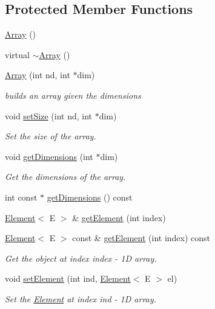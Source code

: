 \subsection*{Protected Member Functions}
\begin{DoxyCompactItemize}
\item 
\hyperlink{classbridges_1_1datastructure_1_1_array_a23cb659c4f39e5e6f3b29a58e97b8e0d}{Array} ()
\item 
virtual \hyperlink{classbridges_1_1datastructure_1_1_array_a5a9f212f560e9673259eece27d8f11cc}{$\sim$\+Array} ()
\item 
\hyperlink{classbridges_1_1datastructure_1_1_array_ac107ce41bbb435dfe6b92129c47bf58e}{Array} (int nd, int $\ast$dim)
\begin{DoxyCompactList}\small\item\em builds an array given the dimensions \end{DoxyCompactList}\item 
void \hyperlink{classbridges_1_1datastructure_1_1_array_a2bfb10e98b1745a7ca173459626352a9}{set\+Size} (int nd, int $\ast$dim)
\begin{DoxyCompactList}\small\item\em Set the size of the array. \end{DoxyCompactList}\item 
void \hyperlink{classbridges_1_1datastructure_1_1_array_aa2a14939c8e53087e833ebf71822a057}{get\+Dimensions} (int $\ast$dim)
\begin{DoxyCompactList}\small\item\em Get the dimensions of the array. \end{DoxyCompactList}\item 
int const  $\ast$ \hyperlink{classbridges_1_1datastructure_1_1_array_a6d9edc546fa172a47f19de3c2ea93ebf}{get\+Dimensions} () const
\item 
\hyperlink{classbridges_1_1datastructure_1_1_element}{Element}$<$ E $>$ \& \hyperlink{classbridges_1_1datastructure_1_1_array_aaf44dbc671651d6e1383d1c523348f28}{get\+Element} (int index)
\item 
\hyperlink{classbridges_1_1datastructure_1_1_element}{Element}$<$ E $>$ const  \& \hyperlink{classbridges_1_1datastructure_1_1_array_ad2704d36d824ef7356fda5f6d7974ba7}{get\+Element} (int index) const
\begin{DoxyCompactList}\small\item\em Get the object at index index -\/ 1D array. \end{DoxyCompactList}\item 
void \hyperlink{classbridges_1_1datastructure_1_1_array_a120174198dc4de388af154d97951e856}{set\+Element} (int ind, \hyperlink{classbridges_1_1datastructure_1_1_element}{Element}$<$ E $>$ el)
\begin{DoxyCompactList}\small\item\em Set the \hyperlink{classbridges_1_1datastructure_1_1_element}{Element} at index ind -\/ 1D array. \end{DoxyCompactList}\end{DoxyCompactItemize}
